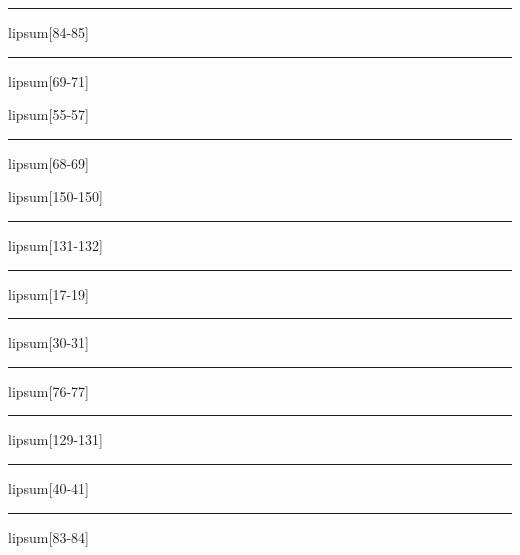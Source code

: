 \documentclass[11pt,a4paper]{article}
\begin{document}
\begin{simplewrap}
  \textcolor{magenta!20}{\rule{4.4cm}{4.2cm}}
\end{simplewrap}
lipsum[84-85]

\begin{simplewrap}
  \textcolor{blue!24}{\rule{5.5cm}{8.4cm}}
\end{simplewrap}
lipsum[69-71]

lipsum[55-57]

\begin{simplewrap}
  \textcolor{red!35}{\rule{5.7cm}{7.1cm}}
\end{simplewrap}
lipsum[68-69]

lipsum[150-150]

\begin{simplewrap}
  \textcolor{olive!47}{\rule{4.2cm}{3.8cm}}
\end{simplewrap}
lipsum[131-132]

\begin{simplewrap}
  \textcolor{blue!17}{\rule{3.5cm}{3.3cm}}
\end{simplewrap}
lipsum[17-19]

\begin{simplewrap}
  \textcolor{blue!43}{\rule{3.8cm}{6.4cm}}
\end{simplewrap}
lipsum[30-31]

\begin{simplewrap}
  \textcolor{magenta!58}{\rule{3.8cm}{7.1cm}}
\end{simplewrap}
lipsum[76-77]

\begin{simplewrap}
  \textcolor{blue!10}{\rule{5.9cm}{9.0cm}}
\end{simplewrap}
lipsum[129-131]

\begin{simplewrap}
  \textcolor{cyan!16}{\rule{5.6cm}{4.4cm}}
\end{simplewrap}
lipsum[40-41]

\begin{simplewrap}
  \textcolor{cyan!44}{\rule{5.9cm}{9.4cm}}
\end{simplewrap}
lipsum[83-84]
\end{document}
